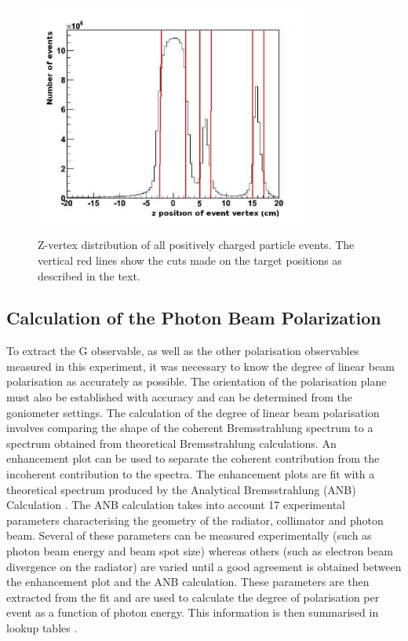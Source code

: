 \begin{figure}[htb]
  \includegraphics[width=0.8\textwidth]{figures/targets_pos.png} \\
  \caption{Z-vertex distribution of all positively charged particle events. The vertical red lines show the cuts made on the target positions as described in the text.}
  \label{fig:target_pos}
\end{figure}



\subsection{Calculation of the Photon Beam Polarization}
To extract the G observable, as well as the other polarisation observables measured in this experiment, it was necessary to know the degree of linear beam polarisation as accurately as possible. The orientation of the polarisation plane must also be established with accuracy and can be determined from the goniometer settings. The calculation of the degree of linear beam polarisation involves comparing the shape of the coherent Bremsstrahlung spectrum to a spectrum obtained from theoretical Bremsstrahlung calculations. An enhancement plot can be used to separate the coherent contribution from the incoherent contribution to the spectra. The enhancement plots are fit with a theoretical spectrum produced by the Analytical Bremsstrahlung (ANB) Calculation \cite{Natter_2003}\cite{Sabin_2010}. The ANB calculation takes into account 17 experimental parameters characterising the geometry of the radiator, collimator and photon beam. Several of these parameters can be measured experimentally (such as photon beam energy and beam spot size) whereas others (such as electron beam divergence on the radiator) are varied until a good agreement is obtained between the enhancement plot and the ANB calculation. These parameters are then extracted from the fit and are used to calculate the degree of polarisation per event as a function of photon energy. This information is then summarised in lookup tables \cite{Anderson_table}.



